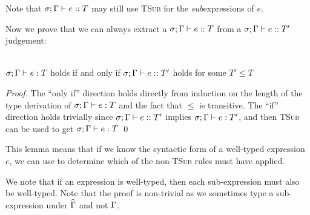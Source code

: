 \noindent Note that $\tye{e}{T}$ may still use \textsc{TSub} for the \emph{sub}expressions of $e$.

\LS

Now we prove that we can always extract a $\tye{e}{T}$ from a $\tye{e}{T'}$ judgement:

\SS\begin{Lemma}\ \\
	\indent $\ty{e}{T}$ holds if and only if $\tye{e}{T'}$ holds for some $T' \leq T$
\end{Lemma}
\SS\begin{proof}
	The ``only if'' direction holds directly from induction on the length of the type derivation of $\ty{e}{T}$ and the fact that $ \leq $ is transitive.
	The ``if'' direction holds trivially since $\tye{e}{T'}$ implies $\ty{e}{T'}$, and then \textsc{TSub} can be used to get $\ty{e}{T}$ 
\qed\end{proof}

\LS

This lemma means that if we know the syntactic form of a well-typed expression $e$, we can use  to determine which of the non-\textsc{TSub} rules must have applied.

\LS

We note that if an expression is well-typed, then each sub-expression must also be well-typed. Note that the proof is non-trivial as we sometimes type a sub-expression under $\widehat{\Gamma}$ and not $\Gamma$.

